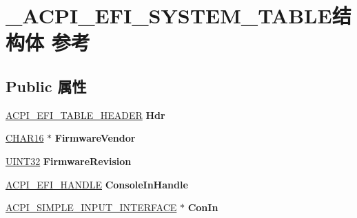 \hypertarget{struct___a_c_p_i___e_f_i___s_y_s_t_e_m___t_a_b_l_e}{}\section{\+\_\+\+A\+C\+P\+I\+\_\+\+E\+F\+I\+\_\+\+S\+Y\+S\+T\+E\+M\+\_\+\+T\+A\+B\+L\+E结构体 参考}
\label{struct___a_c_p_i___e_f_i___s_y_s_t_e_m___t_a_b_l_e}
\subsection*{Public 属性}
\begin{DoxyCompactItemize}
\item 
\mbox{\label{struct___a_c_p_i___e_f_i___s_y_s_t_e_m___t_a_b_l_e_ace466fea2544ecfa0c0fc7a19645743e}} 
\hyperlink{struct___a_c_p_i___e_f_i___t_a_b_l_e___h_e_a_r_d_e_r}{A\+C\+P\+I\+\_\+\+E\+F\+I\+\_\+\+T\+A\+B\+L\+E\+\_\+\+H\+E\+A\+D\+ER} {\bfseries Hdr}
\item 
\mbox{\label{struct___a_c_p_i___e_f_i___s_y_s_t_e_m___t_a_b_l_e_afa52e458b5ccfd98b8b5003d1f3d5b20}} 
\hyperlink{_processor_bind_8h_a7ae886893bd2a2ae253eb2b021a48724}{C\+H\+A\+R16} $\ast$ {\bfseries Firmware\+Vendor}
\item 
\mbox{\label{struct___a_c_p_i___e_f_i___s_y_s_t_e_m___t_a_b_l_e_adca7ec7e3d4d3728ee554b89b6a372ce}} 
\hyperlink{_processor_bind_8h_ae1e6edbbc26d6fbc71a90190d0266018}{U\+I\+N\+T32} {\bfseries Firmware\+Revision}
\item 
\mbox{\label{struct___a_c_p_i___e_f_i___s_y_s_t_e_m___t_a_b_l_e_a26664864e3690756bb6c75ce267fcb10}} 
\hyperlink{interfacevoid}{A\+C\+P\+I\+\_\+\+E\+F\+I\+\_\+\+H\+A\+N\+D\+LE} {\bfseries Console\+In\+Handle}
\item 
\mbox{\label{struct___a_c_p_i___e_f_i___s_y_s_t_e_m___t_a_b_l_e_aa93d3f5e0cd029ff4d09e5d28cd65896}} 
\hyperlink{struct___a_c_p_i___s_i_m_p_l_e___i_n_p_u_t___i_n_t_e_r_f_a_c_e}{A\+C\+P\+I\+\_\+\+S\+I\+M\+P\+L\+E\+\_\+\+I\+N\+P\+U\+T\+\_\+\+I\+N\+T\+E\+R\+F\+A\+CE} $\ast$ {\bfseries Con\+In}

\end{DoxyCompactItemize}
